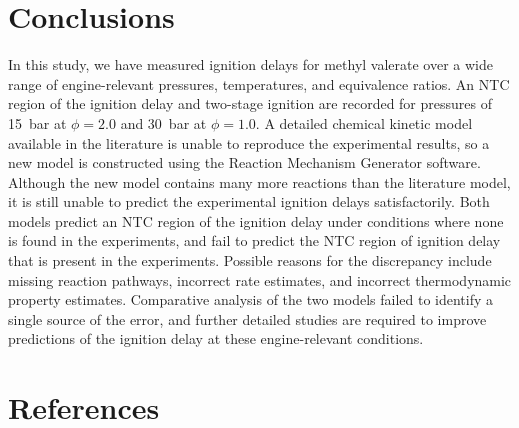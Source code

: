 \documentclass[letterpaper, review, sort&compress]{elsarticle}
\begin{document}
\section{Conclusions}\label{sec:conclusions}

In this study, we have measured ignition delays for methyl valerate over a wide range of
engine-relevant pressures, temperatures, and equivalence ratios. An NTC region of the ignition delay
and two-stage ignition are recorded for pressures of \SI{15}{\bar} at \(\phi=2.0\) and \SI{30}{\bar}
at \(\phi=1.0\). A detailed chemical kinetic model available in the literature is unable to
reproduce the experimental results, so a new model is constructed using the Reaction Mechanism
Generator software. Although the new model contains many more reactions than the literature model,
it is still unable to predict the experimental ignition delays satisfactorily. Both models predict
an NTC region of the ignition delay under conditions where none is found in the experiments, and
fail to predict the NTC region of ignition delay that is present in the experiments. Possible
reasons for the discrepancy include missing reaction pathways, incorrect rate estimates, and
incorrect thermodynamic property estimates. Comparative analysis of the two models failed to
identify a single source of the error, and further detailed studies are required to improve
predictions of the ignition delay at these engine-relevant conditions.

\section*{References}

\end{document}
